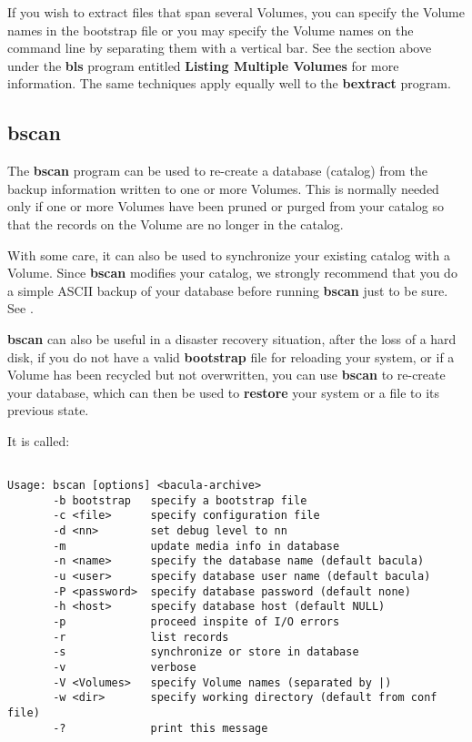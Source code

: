 If you wish to extract files that span several Volumes, you can specify the
Volume names in the bootstrap file or you may specify the Volume names on the
command line by separating them with a vertical bar. See the section above
under the {\bf bls} program entitled {\bf Listing Multiple Volumes} for more
information. The same techniques apply equally well to the {\bf bextract}
program. 

\subsection*{bscan}
\label{bscan}

The {\bf bscan} program can be used to re-create a database (catalog) from the
backup information written to one or more Volumes. This is normally needed
only if one or more Volumes have been pruned or purged from your catalog so
that the records on the Volume are no longer in the catalog. 

With some care, it can also be used to synchronize your existing catalog with
a Volume. Since {\bf bscan} modifies your catalog, we strongly recommend that
you do a simple ASCII backup of your database before running {\bf bscan} just
to be sure. See 
. 

{\bf bscan} can also be useful in a disaster recovery situation, after the
loss of a hard disk, if you do not have a valid {\bf bootstrap} file for
reloading your system, or if a Volume has been recycled but not overwritten,
you can use {\bf bscan} to re-create your database, which can then be used to
{\bf restore} your system or a file to its previous state. 

It is called: 

\footnotesize
\begin{verbatim}
 
Usage: bscan [options] <bacula-archive>
       -b bootstrap   specify a bootstrap file
       -c <file>      specify configuration file
       -d <nn>        set debug level to nn
       -m             update media info in database
       -n <name>      specify the database name (default bacula)
       -u <user>      specify database user name (default bacula)
       -P <password>  specify database password (default none)
       -h <host>      specify database host (default NULL)
       -p             proceed inspite of I/O errors
       -r             list records
       -s             synchronize or store in database
       -v             verbose
       -V <Volumes>   specify Volume names (separated by |)
       -w <dir>       specify working directory (default from conf file)
       -?             print this message
\end{verbatim}
\normalsize

